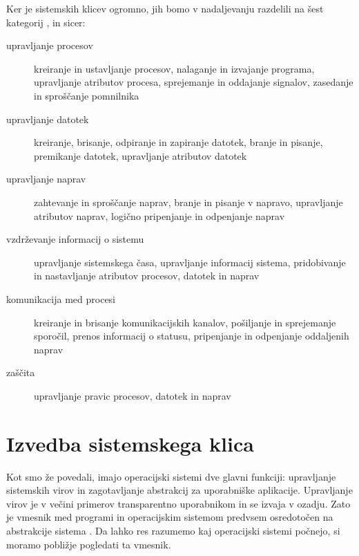 \documentclass[a4paper,12pt,openright]{book}
\begin{document}
Ker je sistemskih klicev ogromno, jih bomo v nadaljevanju razdelili na šest kategorij \cite{Silberschatz_Galvin_Gagne_2018}, in sicer:
\begin{description}
	\item[upravljanje procesov] kreiranje in ustavljanje procesov, nalaganje in izvajanje programa, upravljanje atributov procesa, sprejemanje in oddajanje signalov, zasedanje in sproščanje pomnilnika
	\item[upravljanje datotek] kreiranje, brisanje, odpiranje in zapiranje datotek, branje in pisanje, premikanje datotek, upravljanje atributov datotek
	\item[upravljanje naprav] zahtevanje in sproščanje naprav, branje in pisanje v napravo, upravljanje atributov naprav, logično pripenjanje in odpenjanje naprav
	\item[vzdrževanje informacij o sistemu] upravljanje sistemskega časa, upravljanje informacij sistema, pridobivanje in nastavljanje atributov procesov, datotek in naprav
	\item[komunikacija med procesi] kreiranje in brisanje komunikacijskih kanalov, pošiljanje in sprejemanje sporočil, prenos informacij o statusu, pripenjanje in odpenjanje oddaljenih naprav
	\item[zaščita] upravljanje pravic procesov, datotek in naprav
\end{description}


\section{Izvedba sistemskega klica} \label{sec:syscall_execution}

Kot smo že povedali, imajo operacijski sistemi dve glavni funkciji: upravljanje sistemskih virov in zagotavljanje abstrakcij za uporabniške aplikacije.
Upravljanje virov je v večini primerov transparentno uporabnikom in se izvaja v ozadju. Zato je vmesnik med programi in operacijskim sistemom predvsem osredotočen na abstrakcije sistema \cite{Tanenbaum_Bos_2023}.
Da lahko res razumemo kaj operacijski sistemi počnejo, si moramo pobližje pogledati ta vmesnik.
\end{document}
